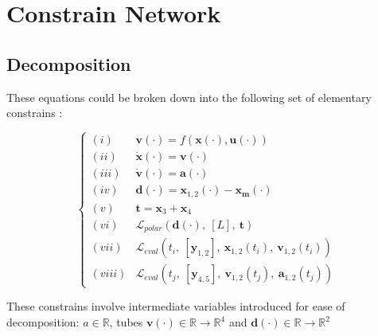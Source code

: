 \section*{Constrain Network}
    \subsection{Decomposition}
        These equations could be broken down into the following set of elementary constrains :

        \begin{equation}
            \label{eqn:constrains}
            \begin{cases}
                (\mathit{i}) & \mathbf{v}(\cdot) = f(\mathbf{x}(\cdot), \mathbf{u}(\cdot)) \\
                (\mathit{ii}) & \dot{\mathbf{x}}(\cdot) = \mathbf{v}(\cdot) \\
                (\mathit{iii}) & \dot{\mathbf{v}}(\cdot) = \mathbf{a}(\cdot) \\
                (\mathit{iv}) &  \mathbf{d} (\cdot)= \mathbf{x}_{1,2}(\cdot) - \mathbf{x_m}(\cdot) \\
                (\mathit{v}) & \mathbf{t} = \mathbf{x}_3+\mathbf{x}_4 \\
                (\mathit{vi}) & \mathcal{L}_{polar}\left(\mathbf{d}(\cdot),\ [L],\ \mathbf{t}\right) \\
                (\mathit{vii}) & \mathcal{L}_{eval}\left(t_i,\ [\textbf{y}_{1,2}],\ \mathbf{x}_{1,2}(t_i),\ \mathbf{v}_{1,2}(t_i)\right) \\
                (\mathit{viii}) & \mathcal{L}_{eval}\left(t_j,\ [\textbf{y}_{4,5}],\ \mathbf{v}_{1,2}(t_j),\ \mathbf{a}_{1,2}(t_j)\right)
            \end{cases}
        \end{equation}

        These constrains involve intermediate variables introduced for ease of decomposition: $a \in \mathbb{R}$, tubes $\mathbf{v}(\cdot) \in \mathbb{R} \rightarrow \mathbb{R}^4$ and $\mathbf{d}(\cdot) \in \mathbb{R} \rightarrow \mathbb{R}^2$